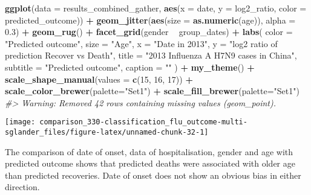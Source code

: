 \documentclass[]{book}
\newenvironment{Shaded}{\begin{snugshade}}{\end{snugshade}}
\newcommand{\CommentTok}[1]{\textcolor[rgb]{0.56,0.35,0.01}{\textit{#1}}}
\newcommand{\DataTypeTok}[1]{\textcolor[rgb]{0.13,0.29,0.53}{#1}}
\newcommand{\DecValTok}[1]{\textcolor[rgb]{0.00,0.00,0.81}{#1}}
\newcommand{\FloatTok}[1]{\textcolor[rgb]{0.00,0.00,0.81}{#1}}
\newcommand{\KeywordTok}[1]{\textcolor[rgb]{0.13,0.29,0.53}{\textbf{#1}}}
\newcommand{\NormalTok}[1]{#1}
\newcommand{\OperatorTok}[1]{\textcolor[rgb]{0.81,0.36,0.00}{\textbf{#1}}}
\newcommand{\StringTok}[1]{\textcolor[rgb]{0.31,0.60,0.02}{#1}}
\begin{document}
\begin{Shaded}
\begin{Highlighting}[]
\KeywordTok{ggplot}\NormalTok{(}\DataTypeTok{data =}\NormalTok{ results_combined_gather, }\KeywordTok{aes}\NormalTok{(}\DataTypeTok{x =}\NormalTok{ date, }\DataTypeTok{y =}\NormalTok{ log2_ratio, }
                                           \DataTypeTok{color =}\NormalTok{ predicted_outcome)) }\OperatorTok{+}
\StringTok{  }\KeywordTok{geom_jitter}\NormalTok{(}\KeywordTok{aes}\NormalTok{(}\DataTypeTok{size =} \KeywordTok{as.numeric}\NormalTok{(age)), }\DataTypeTok{alpha =} \FloatTok{0.3}\NormalTok{) }\OperatorTok{+}
\StringTok{  }\KeywordTok{geom_rug}\NormalTok{() }\OperatorTok{+}
\StringTok{  }\KeywordTok{facet_grid}\NormalTok{(gender }\OperatorTok{~}\StringTok{ }\NormalTok{group_dates) }\OperatorTok{+}
\StringTok{  }\KeywordTok{labs}\NormalTok{(}
    \DataTypeTok{color =} \StringTok{"Predicted outcome"}\NormalTok{,}
    \DataTypeTok{size =} \StringTok{"Age"}\NormalTok{,}
    \DataTypeTok{x =} \StringTok{"Date in 2013"}\NormalTok{,}
    \DataTypeTok{y =} \StringTok{"log2 ratio of prediction Recover vs Death"}\NormalTok{,}
    \DataTypeTok{title =} \StringTok{"2013 Influenza A H7N9 cases in China"}\NormalTok{,}
    \DataTypeTok{subtitle =} \StringTok{"Predicted outcome"}\NormalTok{,}
    \DataTypeTok{caption =} \StringTok{""}
\NormalTok{  ) }\OperatorTok{+}
\StringTok{  }\KeywordTok{my_theme}\NormalTok{() }\OperatorTok{+}
\StringTok{  }\KeywordTok{scale_shape_manual}\NormalTok{(}\DataTypeTok{values =} \KeywordTok{c}\NormalTok{(}\DecValTok{15}\NormalTok{, }\DecValTok{16}\NormalTok{, }\DecValTok{17}\NormalTok{)) }\OperatorTok{+}
\StringTok{  }\KeywordTok{scale_color_brewer}\NormalTok{(}\DataTypeTok{palette=}\StringTok{"Set1"}\NormalTok{) }\OperatorTok{+}
\StringTok{  }\KeywordTok{scale_fill_brewer}\NormalTok{(}\DataTypeTok{palette=}\StringTok{"Set1"}\NormalTok{)}
\CommentTok{#> Warning: Removed 42 rows containing missing values (geom_point).}
\end{Highlighting}
\end{Shaded}

\begin{center}\texttt{[image: comparison\_330-classification\_flu\_outcome-multi-sglander\_files/figure-latex/unnamed-chunk-32-1]} \end{center}

The comparison of date of onset, data of hospitalisation, gender and age with predicted outcome shows that predicted deaths were associated with older age than predicted recoveries. Date of onset does not show an obvious bias in either direction.
\end{document}
